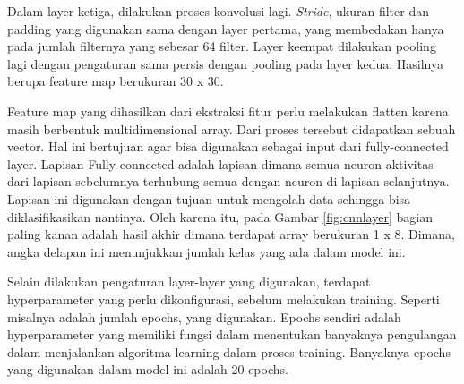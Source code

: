 Dalam layer ketiga, dilakukan proses konvolusi lagi. \emph{Stride}, ukuran filter dan padding yang digunakan sama dengan layer pertama, yang membedakan hanya pada jumlah filternya yang sebesar 64 filter. Layer keempat dilakukan pooling lagi dengan pengaturan sama persis dengan pooling pada layer kedua. Hasilnya berupa feature map berukuran 30 x 30.

Feature map yang dihasilkan dari ekstraksi fitur perlu melakukan flatten karena masih berbentuk multidimensional array. Dari proses tersebut didapatkan sebuah vector. Hal ini bertujuan agar bisa digunakan sebagai input dari fully-connected layer. Lapisan Fully-connected adalah lapisan dimana semua neuron aktivitas dari lapisan sebelumnya terhubung semua dengan neuron di lapisan selanjutnya. Lapisan ini digunakan dengan tujuan untuk mengolah data sehingga bisa diklasifikasikan nantinya. Oleh karena itu, pada Gambar \ref{fig:cnnlayer} bagian paling kanan adalah hasil akhir dimana terdapat array berukuran 1 x 8. Dimana, angka delapan ini menunjukkan jumlah kelas yang ada dalam model ini.

Selain dilakukan pengaturan layer-layer yang digunakan, terdapat hyperparameter yang perlu dikonfigurasi, sebelum melakukan training. Seperti misalnya adalah jumlah epochs, yang digunakan. Epochs sendiri adalah hyperparameter yang memiliki fungsi dalam menentukan banyaknya pengulangan dalam menjalankan algoritma learning dalam proses training. Banyaknya epochs yang digunakan dalam model ini adalah 20 epochs. 



